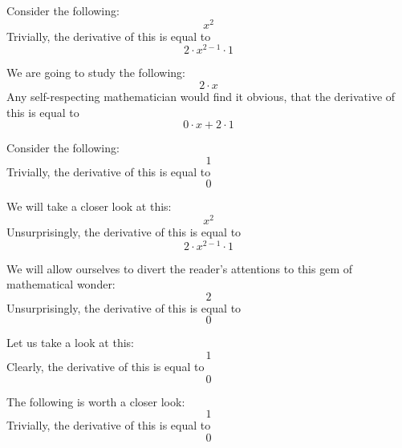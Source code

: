 \documentclass{article}
\begin{document}
Consider the following:
\begin{equation}
x ^{2 } 
\end{equation}
Trivially, the derivative of this is equal to
\begin{equation}
2 \cdot x ^{2 - 1 } \cdot 1 
\end{equation}

We are going to study the following:
\begin{equation}
2 \cdot x 
\end{equation}
Any self-respecting mathematician would find it obvious, that the derivative of this is equal to
\begin{equation}
0 \cdot x + 2 \cdot 1 
\end{equation}

Consider the following:
\begin{equation}
1 
\end{equation}
Trivially, the derivative of this is equal to
\begin{equation}
0 
\end{equation}

We will take a closer look at this:
\begin{equation}
x ^{2 } 
\end{equation}
Unsurprisingly, the derivative of this is equal to
\begin{equation}
2 \cdot x ^{2 - 1 } \cdot 1 
\end{equation}

We will allow ourselves to divert the reader's attentions to this gem of mathematical wonder:
\begin{equation}
2 
\end{equation}
Unsurprisingly, the derivative of this is equal to
\begin{equation}
0 
\end{equation}

Let us take a look at this:
\begin{equation}
1 
\end{equation}
Clearly, the derivative of this is equal to
\begin{equation}
0 
\end{equation}

The following is worth a closer look:
\begin{equation}
1 
\end{equation}
Trivially, the derivative of this is equal to
\begin{equation}
0 
\end{equation}
\end{document}

